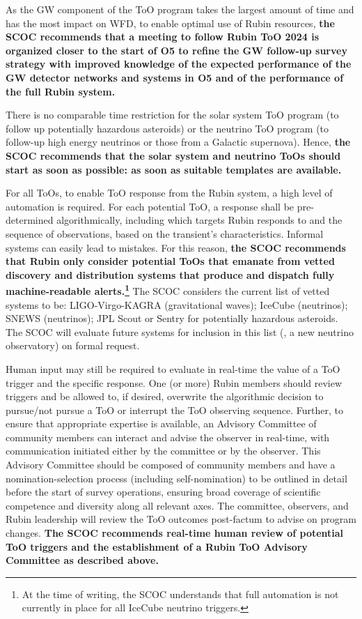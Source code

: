 As the GW component of the ToO program takes the largest amount of time and has the most impact on WFD, to enable optimal use of Rubin resources, {\bf the SCOC recommends that a meeting to follow Rubin ToO 2024 is organized closer to the start of O5 to refine the GW follow-up survey strategy with improved knowledge of the expected performance of the GW detector networks and systems in O5 and of the performance of the full Rubin system.}
%

There is no comparable time restriction for the solar system ToO program (to follow up potentially hazardous asteroids) or the neutrino ToO program (to follow-up high energy neutrinos or those from a Galactic supernova). Hence, {\bf the SCOC recommends that the solar system and neutrino ToOs should start as soon as possible: as soon as suitable templates are available.} 



For all ToOs, to enable ToO response from the Rubin system, a high level of automation is required. For each potential ToO, a response shall be pre-determined algorithmically, including which targets Rubin responds to and the sequence of observations, based on the transient’s characteristics. Informal systems can easily lead to mistakes. For this reason, {\bf the SCOC recommends that Rubin only consider potential ToOs that emanate from vetted discovery and distribution systems that produce and dispatch fully machine-readable alerts.\footnote{At the time of writing, the SCOC understands that full automation is not currently in place for all IceCube neutrino triggers.}} The SCOC considers the current list of vetted systems to be: LIGO-Virgo-KAGRA (gravitational waves); IceCube (neutrinos); SNEWS (neutrinos); JPL Scout or Sentry for potentially hazardous asteroids. The SCOC will evaluate future systems for inclusion in this list (\eg , a new neutrino observatory) on formal request.

Human input may still be required to evaluate in real-time the value of a ToO trigger and the specific response.  One (or more) Rubin members %
should review triggers and be allowed to, if desired, overwrite the algorithmic decision to pursue/not pursue a ToO or interrupt the ToO observing sequence. Further, to ensure that appropriate expertise is available, an Advisory Committee of community members can interact and advise the observer in real-time, with communication initiated either by the committee or by the observer. 
This Advisory Committee should be composed of community members and have a nomination-selection process (including self-nomination) to be outlined in detail before the start of survey operations, ensuring broad coverage of scientific competence and diversity along all relevant axes.
The committee, observers, and Rubin leadership will review the ToO outcomes post-factum to advise on program changes. 
{\bf The SCOC recommends real-time human review of potential ToO triggers and the establishment of a Rubin ToO Advisory Committee as described above.}



